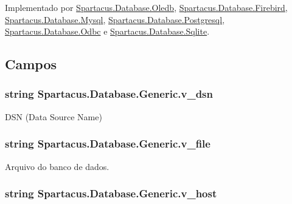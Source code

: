 Implementado por \hyperlink{classSpartacus_1_1Database_1_1Oledb_ab5f3ae20ac53dcc95182c0845a04d460}{Spartacus.\+Database.\+Oledb}, \hyperlink{classSpartacus_1_1Database_1_1Firebird_a6243d18345e2b5f44ddcda032f6b2b9e}{Spartacus.\+Database.\+Firebird}, \hyperlink{classSpartacus_1_1Database_1_1Mysql_a2b7f2096a3ee819670c49ed41cf04f75}{Spartacus.\+Database.\+Mysql}, \hyperlink{classSpartacus_1_1Database_1_1Postgresql_ad14dbb0c81571d02b368388d8a8ebd97}{Spartacus.\+Database.\+Postgresql}, \hyperlink{classSpartacus_1_1Database_1_1Odbc_a7b6d07dad45f3124d081976d2b51ed4b}{Spartacus.\+Database.\+Odbc} e \hyperlink{classSpartacus_1_1Database_1_1Sqlite_a935c96905011800e4df8ad0a7ca9bcf3}{Spartacus.\+Database.\+Sqlite}.



\subsection{Campos}
\hypertarget{classSpartacus_1_1Database_1_1Generic_a91f7c26ea6ab2875fbeafc42905b423f}{
\subsubsection[{v\+\_\+dsn}]{\setlength{\rightskip}{0pt plus 5cm}string Spartacus.\+Database.\+Generic.\+v\+\_\+dsn}}\label{classSpartacus_1_1Database_1_1Generic_a91f7c26ea6ab2875fbeafc42905b423f}


D\+S\+N (Data Source Name) 

\hypertarget{classSpartacus_1_1Database_1_1Generic_a2afdda7bc7ad1bad84a5dc08bf6bd4e6}{
\subsubsection[{v\+\_\+file}]{\setlength{\rightskip}{0pt plus 5cm}string Spartacus.\+Database.\+Generic.\+v\+\_\+file}}\label{classSpartacus_1_1Database_1_1Generic_a2afdda7bc7ad1bad84a5dc08bf6bd4e6}


Arquivo do banco de dados. 

\hypertarget{classSpartacus_1_1Database_1_1Generic_adcf095a019d81c98b5f4c23ffe010cc4}{
\subsubsection[{v\+\_\+host}]{\setlength{\rightskip}{0pt plus 5cm}string Spartacus.\+Database.\+Generic.\+v\+\_\+host}}\label{classSpartacus_1_1Database_1_1Generic_adcf095a019d81c98b5f4c23ffe010cc4}


